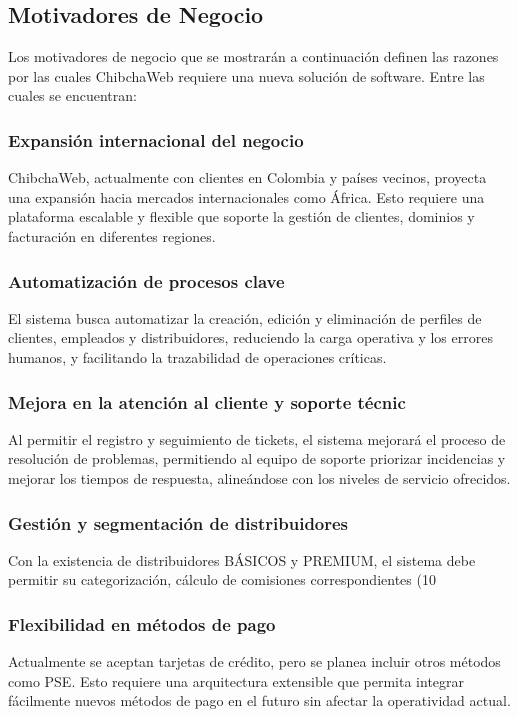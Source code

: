 \subsection{Motivadores de Negocio}
Los motivadores de negocio que se mostrarán a continuación definen las razones por las cuales ChibchaWeb requiere una nueva solución de software. Entre las cuales se encuentran:

\subsubsection{Expansión internacional del negocio}
ChibchaWeb, actualmente con clientes en Colombia y países vecinos, proyecta una expansión hacia mercados internacionales como África. Esto requiere una plataforma escalable y flexible que soporte la gestión de clientes, dominios y facturación en diferentes regiones.

\subsubsection{Automatización de procesos clave}
El sistema busca automatizar la creación, edición y eliminación de perfiles de clientes, empleados y distribuidores, reduciendo la carga operativa y los errores humanos, y facilitando la trazabilidad de operaciones críticas.

\subsubsection{Mejora en la atención al cliente y soporte técnic}

Al permitir el registro y seguimiento de tickets, el sistema mejorará el proceso de resolución de problemas, permitiendo al equipo de soporte priorizar incidencias y mejorar los tiempos de respuesta, alineándose con los niveles de servicio ofrecidos.

\subsubsection{Gestión y segmentación de distribuidores}
Con la existencia de distribuidores BÁSICOS y PREMIUM, el sistema debe permitir su categorización, cálculo de comisiones correspondientes (10%

\subsubsection{Flexibilidad en métodos de pago}
Actualmente se aceptan tarjetas de crédito, pero se planea incluir otros métodos como PSE. Esto requiere una arquitectura extensible que permita integrar fácilmente nuevos métodos de pago en el futuro sin afectar la operatividad actual.

